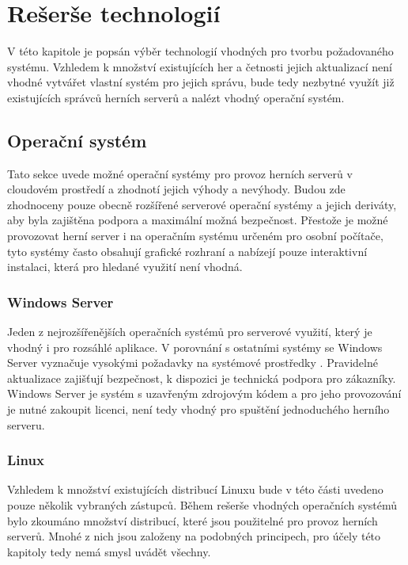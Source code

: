 \chapter{Rešerše technologií}

V této kapitole je popsán výběr technologií vhodných pro tvorbu požadovaného systému.
Vzhledem k množství existujících her a četnosti jejich aktualizací není vhodné vytvářet vlastní
systém pro jejich správu, bude tedy nezbytné využít již existujících správců herních serverů a nalézt vhodný
operační systém.

\section{Operační systém}

Tato sekce uvede možné operační systémy pro provoz herních serverů v cloudovém prostředí a zhodnotí
jejich výhody a nevýhody. Budou zde zhodnoceny pouze obecně rozšířené serverové operační systémy \cite{server_os_share} a jejich deriváty,
aby byla zajištěna podpora a maximální možná bezpečnost. Přestože je možné provozovat herní server i na operačním systému
určeném pro osobní počítače, tyto systémy často obsahují grafické rozhraní a nabízejí pouze interaktivní instalaci, která
pro hledané využití není vhodná.

\subsection{Windows Server}

Jeden z nejrozšířenějších operačních systémů pro serverové využití, který je vhodný i pro rozsáhlé aplikace.
V porovnání s ostatními systémy se Windows Server vyznačuje vysokými požadavky na
systémové prostředky \cite{windows_server_reqs}. Pravidelné aktualizace zajišťují bezpečnost, k dispozici je technická
podpora pro zákazníky. Windows Server je systém s uzavřeným zdrojovým kódem a pro jeho provozování je nutné zakoupit licenci,
není tedy vhodný pro spuštění jednoduchého herního serveru.

\subsection{Linux}

Vzhledem k množství existujících distribucí Linuxu bude v této části uvedeno pouze několik vybraných zástupců.
Během rešerše vhodných operačních systémů bylo zkoumáno množství distribucí, které jsou použitelné pro provoz
herních serverů. Mnohé z nich jsou založeny na podobných principech, pro účely této kapitoly tedy nemá smysl uvádět všechny.


